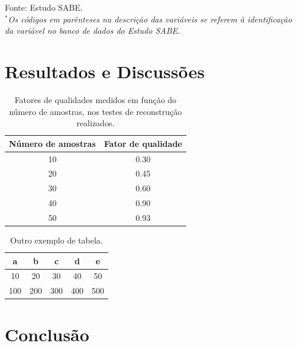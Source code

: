 \documentclass[a4paper, 12pt]{ppgeb}
\begin{document}
\begin{quadro}
\begin{center}
\begin{tabular}{|l|l|l|}
\hline
\end{tabular}
\end{center}
\vspace{-12pt}
Fonte: Estudo SABE.\\
\emph{${^{\textrm{*} }}$Os códigos em parênteses na descrição das variáveis se referem à identificação da variável no banco de dados do Estudo SABE.}~\cite{Gomes2011}
\end{quadro}

\chapter{Resultados e Discussões}\label{chap:RD}

\begin{table}[h]
\centering
\caption{Fatores de qualidades medidos em função do número de amostras, nos testes de reconstrução realizados.}\label{tab:qualidade}
\begin{tabular}{cc}
\toprule
Número de amostras & Fator de qualidade\\
\midrule
10 & 0.30\\
20 & 0.45\\
30 & 0.60\\
40 & 0.90\\
50 & 0.93\\
\bottomrule
\end{tabular}
\end{table}

\begin{table}[h]
\centering
\caption{Outro exemplo de tabela.}\label{tab:outroexemplo}
\begin{tabular}{ccccc}
    \toprule
    a     & b     & c     & d     & e \\
    \midrule
    10    & 20    & 30    & 40    & 50 \\
    100   & 200   & 300   & 400   & 500 \\
    \bottomrule
    \end{tabular}%
\end{table}

\chapter{Conclusão}\label{chap:Conclusao}

\renewcommand\bibname{\Large\scshape Lista de Referências}


\renewcommand{\theapendice}{\Alph{apendice}}
\DeclareRobustCommand{\novoapendice}[1]{%
    \refstepcounter{apendice}%
    \phantom{\theapendice}\label{#1}}
\end{document}
